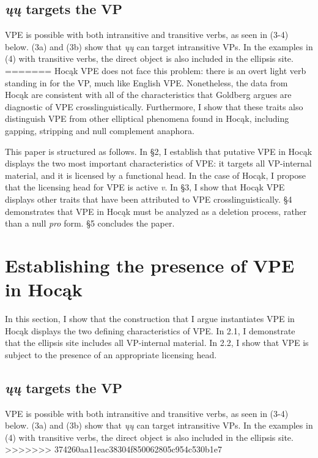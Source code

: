 \documentclass[output=paper]{LSP/langsci}
\begin{document}
\subsection{\emph{ųų} targets the VP}

VPE is possible with both intransitive and transitive verbs, as seen in (3-4) below. (3a) and (3b) show that \emph{ųų} can target intransitive VPs. In the examples in (4) with transitive verbs, the direct object is also included in the ellipsis site.
=======
Hoc\k{a}k VPE does not face this problem: there is an overt light verb standing in for the VP, much like English VPE. Nonetheless, the data from Hoc\k{a}k are consistent with all of the characteristics that Goldberg argues are diagnostic of VPE crosslinguistically. Furthermore, I show that these traits also distinguish VPE from other elliptical phenomena found in Hoc\k{a}k, including gapping, stripping and null complement anaphora. 

This paper is structured as follows. In \S 2, I establish that putative VPE in Hoc\k{a}k displays the two most important characteristics of VPE: it targets all VP-internal material, and it is licensed by a functional head. In the case of Hoc\k{a}k, I propose that the licensing head for VPE is active \emph{v}. In \S 3, I show that Hoc\k{a}k VPE displays other traits that have been attributed to VPE crosslinguistically. \S 4 demonstrates that VPE in Hoc\k{a}k must be analyzed as a deletion process, rather than a null \emph{pro} form. \S 5 concludes the paper.

\section{Establishing the presence of VPE in Hoc\k{a}k}

In this section, I show that the construction that I argue instantiates VPE in Hoc\k{a}k displays the two defining characteristics of VPE. In 2.1, I demonstrate that the ellipsis site includes all VP-internal material. In 2.2, I show that VPE is subject to the presence of an appropriate licensing head.

\subsection{\emph{\k{u}\k{u}} targets the VP}

VPE is possible with both intransitive and transitive verbs, as seen in (3-4) below. (3a) and (3b) show that \emph{\k{u}\k{u}} can target intransitive VPs. In the examples in (4) with transitive verbs, the direct object is also included in the ellipsis site.
>>>>>>> 374260aa11eac38304f850062805c954c530b1e7
\end{document}
